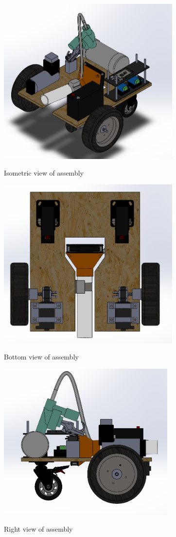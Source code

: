 \documentclass[12pt,letterpaper,titlepage]{article}
\begin{document}
\begin{figure}[H]
	\centering
	\includegraphics[width=3.6in]{images/layout1}
	\label{fig:layout1}
	\caption{Isometric view of assembly}
\end{figure}
\begin{figure}[H]
	\centering
	\includegraphics[width=3.6in]{images/layout2}
	\label{fig:layout2}
	\caption{Bottom view of assembly}
\end{figure}
\begin{figure}[H]
	\centering
	\includegraphics[width=3.5in]{images/layout3}
	\label{fig:layout3}
	\caption{Right view of assembly}
\end{figure}
\end{document}
